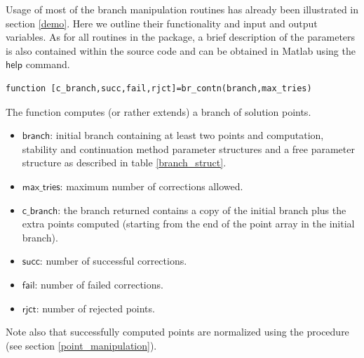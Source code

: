 \documentclass[10pt]{article}
\gdef \file#1{{\bfseries{\ttfamily{#1}}}}
\gdef \parm#1{{\mathsf{#1}}}
\begin{document}
{Usage of most of
the branch manipulation routines has already been illustrated
in section \ref{demo}.
Here we outline their functionality and input and output variables.
As for all routines in the package, 
a brief description of the parameters is also contained
within the source code and can be obtained in Matlab using the
$\parm{help}$ command.

{\small\begin{verbatim}
function [c_branch,succ,fail,rjct]=br_contn(branch,max_tries)
\end{verbatim}}
\noindent The function \file{br\_contn} computes (or rather 
extends) a branch of solution
points. 
\begin{itemize}
\item $\parm{branch}$: initial branch 
containing at least two points and computation, stability and 
continuation method parameter
structures and a free parameter structure as described in 
table \ref{branch_struct}. 
\item $\parm{max\_tries}$:
maximum number of corrections allowed.
\item $\parm{c\_branch}$:
the branch returned contains a copy of the initial branch plus
the extra points computed (starting from the end of the point array in the
initial branch). 
\item $\parm{succ}$: number of successful corrections.
\item $\parm{fail}$: number of failed corrections.
\item $\parm{rjct}$: number of rejected points.
\end{itemize}
Note also that successfully computed points are normalized using the procedure
\file{p\_normlz} (see section \ref{point_manipulation}). 

}
\end{document}
